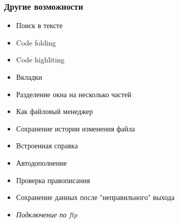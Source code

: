 \documentclass[aspectratio=169]{beamer}
\begin{document}
    \begin{frame}\frametitle{Другие возможности}
        \begin{itemize}
            \item Поиск в тексте
            \item Code folding
            \item Code highliting
            \item Вкладки
            \item Разделение окна на несколько частей
            \item Как файловый менеджер
            \item Сохранение истории изменения файла
            \item Встроенная справка
            \item Автодополнение
            \item Проверка правописания
            \item Сохранение данных после "неправильного" выхода
            \item \textit{Подключение по ftp}
        \end{itemize}
    \end{frame}
\end{document}
